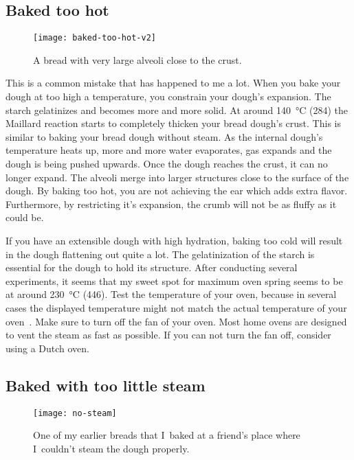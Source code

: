 \subsection{Baked too hot}

\begin{figure}
  \texttt{[image: baked-too-hot-v2]}
  \caption{A bread with very large alveoli close to the crust.}%
  \label{baked-too-hot}
\end{figure}

This is a common mistake that has happened to me a lot. When you bake your dough
at too high a temperature, you constrain your dough's expansion. The starch
gelatinizes and becomes more and more solid. At around
\qty{140}{\degreeCelsius} (\qty{284}{\degF}) the Maillard reaction starts to
completely thicken your bread dough's crust. This is similar to baking your
bread dough without steam. As the internal dough's temperature heats up,
more and more water evaporates, gas expands and the dough is being pushed upwards.
Once the dough reaches the crust, it can no longer expand. The alveoli merge
into larger structures close to the surface of the dough. By baking too hot,
you are not achieving the ear which adds extra flavor. Furthermore, by restricting
it's expansion, the crumb will not be as fluffy as it could be.

If you have an extensible dough with high hydration, baking too cold will result
in the dough flattening out quite a lot. The gelatinization of the starch is
essential for the dough to hold its structure. After conducting several
experiments, it seems that my sweet spot for maximum oven spring seems to be
at around \qty{230}{\degreeCelsius} (\qty{446}{\degF}). Test the temperature
of your oven, because in several
cases the displayed temperature might not match the actual temperature of your
oven~\cite{too+hot+baking}. Make sure to turn off the fan of your oven. Most
home ovens are designed to vent the steam as fast as possible. If you can not
turn the fan off, consider using a Dutch oven.

\subsection{Baked with too little steam}

\begin{figure}[h]
  \texttt{[image: no-steam]}
  \caption[Bread baked with too little steam]{One of my earlier breads that
      I~baked at a friend's place where I~couldn't steam the dough properly.}%
  \label{no-steam}
\end{figure}

